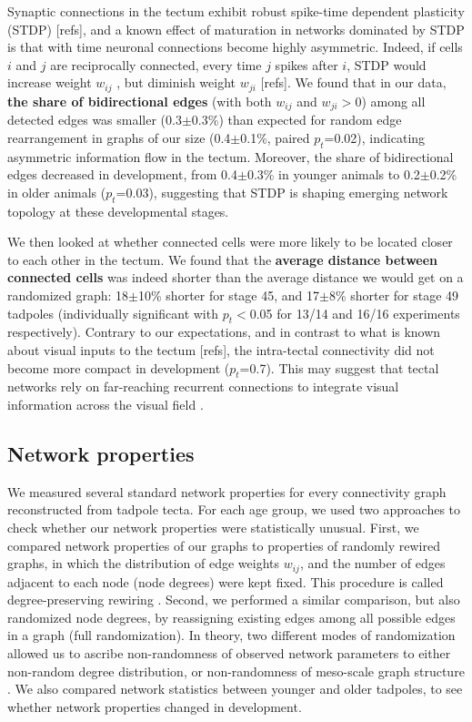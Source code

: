 \documentclass{article}
\begin{document}
Synaptic connections in the tectum exhibit robust spike-time dependent plasticity (STDP) \citep{mu2006stdp,pratt2008recurrent}[refs], and a known effect of maturation in networks dominated by STDP is that with time neuronal connections become highly asymmetric. Indeed, if cells $i$ and $j$ are reciprocally connected, every time $j$ spikes after $i$, STDP would increase weight $w_{ij}$ , but diminish weight $w_{ji}$ \citep{abbott1996ltpsequence}[refs]. We found that in our data, \textbf{the share of bidirectional edges} (with both $w_{ij}$ and $w_{ji}>$0) among all detected edges was smaller (0.3$\pm$0.3\%) than expected for random edge rearrangement in graphs of our size (0.4$\pm$0.1\%, paired $p_t$=0.02), indicating asymmetric information flow in the tectum. Moreover, the share of bidirectional edges decreased in development, from 0.4$\pm$0.3\% in younger animals to 0.2$\pm$0.2\% in older animals ($p_t$=0.03), suggesting that STDP is shaping emerging network topology at these developmental stages.

We then looked at whether connected cells were more likely to be located closer to each other in the tectum. We found that the \textbf{average distance between connected cells} was indeed shorter than the average distance we would get on a randomized graph: 18$\pm$10\% shorter for stage 45, and 17$\pm$8\% shorter for stage 49 tadpoles (individually significant with $p_t<$0.05 for 13/14 and 16/16 experiments respectively). Contrary to our expectations, and in contrast to what is known about visual inputs to the tectum \citep{tao2005refinement}[refs], the intra-tectal connectivity did not become more compact in development ($p_t$=0.7). This may suggest that tectal networks rely on far-reaching recurrent connections to integrate visual information across the visual field \citep{baginskas2009recurrent,liu2016jumbo,jang2016}.

\subsection*{Network properties}

We measured several standard network properties for every connectivity graph reconstructed from tadpole tecta. For each age group, we used two approaches to check whether our network properties were statistically unusual. First, we compared network properties of our graphs to properties of randomly rewired graphs, in which the distribution of edge weights $w_{ij}$, and the number of edges adjacent to each node (node degrees) were kept fixed. This procedure is called degree-preserving rewiring \citep{maslov2002}. Second, we performed a similar comparison, but also randomized node degrees, by reassigning existing edges among all possible edges in a graph (full randomization). In theory, two different modes of randomization allowed us to ascribe non-randomness of observed network parameters to either non-random degree distribution, or non-randomness of meso-scale graph structure \citep{ansmann2012surrogate}. We also compared network statistics between younger and older tadpoles, to see whether network properties changed in development.
\end{document}
